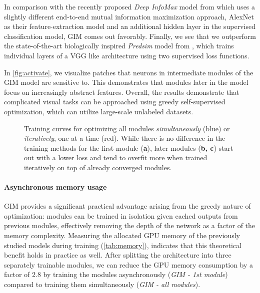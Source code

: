 \documentclass{article}
\begin{document}
In comparison with the recently proposed
\textit{Deep InfoMax} model from \citet{hjelm2018learning} which uses a slightly different end-to-end mutual information maximization approach, AlexNet \citep{krizhevsky2012imagenet} as their feature-extraction model and an additional hidden layer in the supervised classification model, GIM comes out favorably. Finally, we see that we outperform the state-of-the-art biologically inspired \textit{Predsim} model from \citet{nokland2019training}, which trains individual layers of a VGG like architecture \citep{simonyan2014very} using two supervised loss functions. 

In \cref{fig:activate}, we visualize patches that neurons in intermediate modules of the GIM model are sensitive to. This demonstrates that modules later in the model focus on increasingly abstract features. Overall, the results demonstrate that complicated visual tasks can be approached using greedy self-supervised optimization, which can utilize large-scale unlabeled datasets. 










\begin{figure*}[t]
    \centering
        \hfill
        \hfill
    \caption{Training curves for optimizing all modules \textit{simultaneously} (blue) or \textit{iteratively}, one at a time (red). While there is no difference in the training methods for the first module (\textbf{a}), later modules (\textbf{b, c}) start out with a lower loss and tend to overfit more when trained iteratively on top of already converged modules. }
    \label{fig:loss}
\end{figure*}


\paragraph{Asynchronous memory usage}
GIM provides a significant practical advantage arising from the greedy nature of optimization: modules can be trained in isolation given cached outputs from previous modules, effectively removing the depth of the network as a factor of the memory complexity. Measuring the allocated GPU memory of the previously studied models during training (\cref{tab:memory}), indicates that this theoretical benefit holds in practice as well. After splitting the architecture into three separately trainable modules, we can reduce the GPU memory consumption by a factor of 2.8 by training the modules asynchronously (\textit{GIM - 1st module}) compared to training them simultaneously (\textit{GIM - all modules}).
\end{document}
